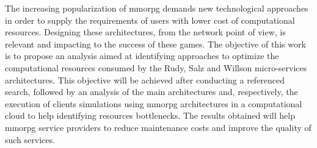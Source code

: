 The increasing popularization of \acf{mmorpg} demands new technological approaches in order to supply the requirements of users with lower cost of computational resources.
%
Designing these architectures, from the network point of view, is relevant and impacting to the success of these games.
%
The objective of this work is to propose an analysis aimed at identifying approaches to optimize the computational resources consumed by the Rudy, Salz and Willson micro-services architectures.
%
This objective will be achieved after conducting a referenced search, followed by an analysis of the main architectures and, respectively, the execution of clients simulations using \ac{mmorpg} architectures in a computational cloud to help identifying resources bottlenecks.
%
The results obtained will help \ac{mmorpg} service providers to reduce maintenance costs and improve the quality of such services. \\